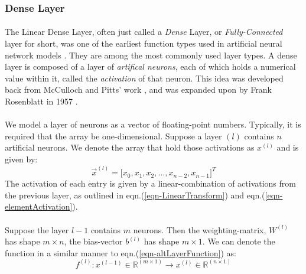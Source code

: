 \documentclass[12pt,letterpaper]{article}
\begin{document}

\subsubsection{Dense Layer}
\label{subsubsec-DenseLayer}

\paragraph*{}The Linear Dense Layer, often just called a \textit{Dense} Layer, or \textit{Fully-Connected} layer for short, was one of the earliest function types used in artificial neural network models \cite{Geron2,Loy}. They are among the most commonly used layer types. A dense layer is composed of a layer of \textit{artifical neurons}, each of which holds a numerical value within it, called the \textit{activation} of that neuron. This idea was developed back from McCulloch and Pitts' work \cite{McCulloch}, and was expanded upon by Frank Rosenblatt in  1957 \cite{Geron}.

\paragraph*{}We model a layer of neurons as a vector of floating-point numbers. Typically, it is required that the array be one-dimensional. Suppose a layer $(l)$ contains $n$ artificial neurons. We denote the array that hold those activations as $x^{(l)}$ and is given by:
\begin{equation}
\label{layer-DenseNeurons}
\vec{x}^{(l)} = \Big[ x_0, x_1, x_2, \hdots , x_{n-2}, x_{n-1} \Big]^T
\end{equation}
The activation of each entry is given by a linear-combination of activations from the previous layer, as outlined in eqn.(\ref{eqn-LinearTransform}) and eqn.(\ref{eqn-elementActivation}).

\paragraph*{}Suppose the layer $l-1$ contains $m$ neurons. Then the weighting-matrix, $W^{(l)}$ has shape $m \times n$, the bias-vector $b^{(l)}$ has shape $m \times 1$. We can denote the function in a similar manner to eqn.(\ref{eqn-altLayerFunction}) as:
\begin{equation}
\label{eqn-FunctionDense}
f^{(l)} : x^{(l-1)} \in \mathbb{R}^{(m \times 1)} \rightarrow x^{(l)} \in \mathbb{R}^{(n \times 1)}
\end{equation}
\end{document}
